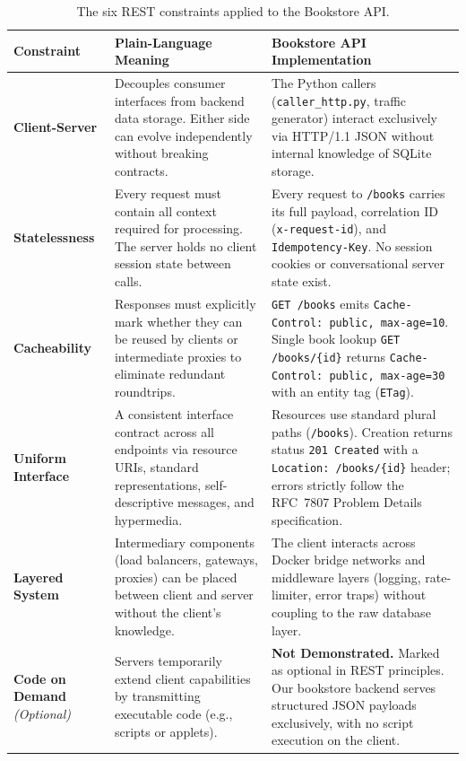 \documentclass[11pt,a4paper]{article}
\begin{document}
\begin{table}[h!]
\centering
\small
\renewcommand{\arraystretch}{1.25}
\begin{tabularx}{\textwidth}{p{3.2cm} p{5.5cm} X}
\toprule
\textbf{Constraint} & \textbf{Plain-Language Meaning} & \textbf{Bookstore API Implementation} \\
\midrule
\textbf{Client-Server} & Decouples consumer interfaces from backend data storage. Either side can evolve independently without breaking contracts. & The Python callers (\texttt{caller\_http.py}, traffic generator) interact exclusively via HTTP/1.1 JSON without internal knowledge of SQLite storage. \\
\textbf{Statelessness} & Every request must contain all context required for processing. The server holds no client session state between calls. & Every request to \texttt{/books} carries its full payload, correlation ID (\texttt{x-request-id}), and \texttt{Idempotency-Key}. No session cookies or conversational server state exist. \\
\textbf{Cacheability} & Responses must explicitly mark whether they can be reused by clients or intermediate proxies to eliminate redundant roundtrips. & \texttt{GET /books} emits \texttt{Cache-Control: public, max-age=10}. Single book lookup \texttt{GET /books/\{id\}} returns \texttt{Cache-Control: public, max-age=30} with an entity tag (\texttt{ETag}). \\
\textbf{Uniform Interface} & A consistent interface contract across all endpoints via resource URIs, standard representations, self-descriptive messages, and hypermedia. & Resources use standard plural paths (\texttt{/books}). Creation returns status \texttt{201 Created} with a \texttt{Location: /books/\{id\}} header; errors strictly follow the RFC~7807 Problem Details specification. \\
\textbf{Layered System} & Intermediary components (load balancers, gateways, proxies) can be placed between client and server without the client's knowledge. & The client interacts across Docker bridge networks and middleware layers (logging, rate-limiter, error traps) without coupling to the raw database layer. \\
\textbf{Code on Demand} \newline \textit{(Optional)} & Servers temporarily extend client capabilities by transmitting executable code (e.g., scripts or applets). & \textbf{Not Demonstrated.} Marked as optional in REST principles. Our bookstore backend serves structured JSON payloads exclusively, with no script execution on the client. \\
\bottomrule
\end{tabularx}
\caption{The six REST constraints applied to the Bookstore API.}
\label{tab:rest_constraints}
\end{table}
\end{document}

